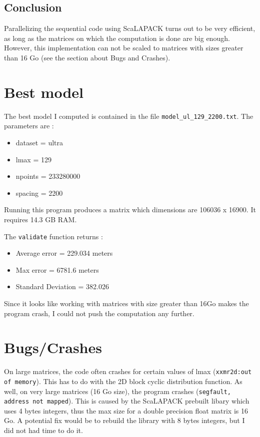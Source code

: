 \documentclass{article}
\begin{document}
\subsection{Conclusion}

Parallelizing the sequential code using ScaLAPACK turns out to be very efficient, as long as the matrices on which the computation is done are big enough. However, this implementation can not be scaled to matrices with sizes greater than 16 Go (see the section about Bugs and Crashes). 

\section{Best model}

\par The best model I computed is contained in the file \verb |model_ul_129_2200.txt|. The parameters are : 

\begin{itemize}
    \item dataset = ultra
    \item lmax = 129
    \item npoints = 233280000
    \item spacing = 2200
\end{itemize}

Running this program produces a matrix which dimensions are 106036 x 16900. It requires 14.3 GB RAM.  
\par The \verb |validate| function returns : 

\begin{itemize}
    \item Average error = 229.034 meters
    \item Max error = 6781.6 meters
    \item Standard Deviation = 382.026
\end{itemize}

Since it looks like working with matrices with size greater than 16Go makes the program crash, I could not push the computation any further. 

\section{Bugs/Crashes}
    
\par On large matrices, the code often crashes for certain values of lmax (\verb |xxmr2d:out of memory|). This has to do with the 2D block cyclic distribution function. As well, on very large matrices (16 Go size), the program crashes (\verb |segfault, address not mapped|). This is caused by the ScaLAPACK prebuilt libary which uses 4 bytes integers, thus the max size for a double precision float matrix is 16 Go. A potential fix would be to rebuild the library with 8 bytes integers, but I did not had time to do it.
\end{document}
